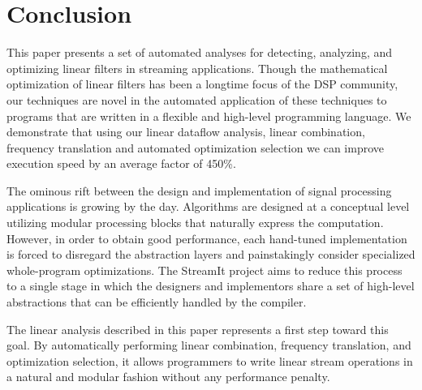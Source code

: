 \section{Conclusion}
\label{sec:conclusion}

This paper presents a set of automated analyses for detecting,
analyzing, and optimizing linear filters in streaming applications.
Though the mathematical optimization of linear filters has been a
longtime focus of the DSP community, our techniques are novel in the
automated application of these techniques to programs that are written
in a flexible and high-level programming language.  We demonstrate
that using our linear dataflow analysis, linear combination, frequency
translation and automated optimization selection we can improve
execution speed by an average factor of 450\%.

The ominous rift between the design and implementation of signal
processing applications is growing by the day.  Algorithms are
designed at a conceptual level utilizing modular processing blocks
that naturally express the computation.  However, in order to obtain
good performance, each hand-tuned implementation is forced to
disregard the abstraction layers and painstakingly consider
specialized whole-program optimizations. The StreamIt project aims to
reduce this process to a single stage in which the designers and
implementors share a set of high-level abstractions that can be
efficiently handled by the compiler.

The linear analysis described in this paper represents a first step
toward this goal.  By automatically performing linear combination,
frequency translation, and optimization selection, it allows
programmers to write linear stream operations in a natural and modular
fashion without any performance penalty.


